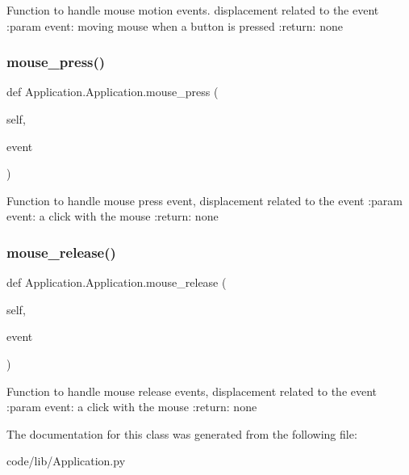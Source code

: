 \begin{DoxyVerb}Function to handle mouse motion events. displacement related to the event
:param event: moving mouse when a button is pressed
:return: none
\end{DoxyVerb}
 \mbox{\label{class_application_1_1_application_ab71deae47ac8b52b81ca833c5fdd3da0}} 
\subsubsection{\texorpdfstring{mouse\+\_\+press()}{mouse\_press()}}
{\footnotesize\ttfamily def Application.\+Application.\+mouse\+\_\+press (\begin{DoxyParamCaption}\item[{}]{self,  }\item[{}]{event }\end{DoxyParamCaption})}

\begin{DoxyVerb}Function to handle mouse press event, displacement related to the event
:param event: a click with the mouse
:return: none\end{DoxyVerb}
 \mbox{\label{class_application_1_1_application_a239b47672cfb2b3e71302d0536a54e82}} 
\subsubsection{\texorpdfstring{mouse\+\_\+release()}{mouse\_release()}}
{\footnotesize\ttfamily def Application.\+Application.\+mouse\+\_\+release (\begin{DoxyParamCaption}\item[{}]{self,  }\item[{}]{event }\end{DoxyParamCaption})}

\begin{DoxyVerb}Function to handle mouse release events, displacement related to the event
:param event: a click with the mouse
:return: none
\end{DoxyVerb}
 

The documentation for this class was generated from the following file\+:\begin{DoxyCompactItemize}
\item 
code/lib/Application.\+py\end{DoxyCompactItemize}
